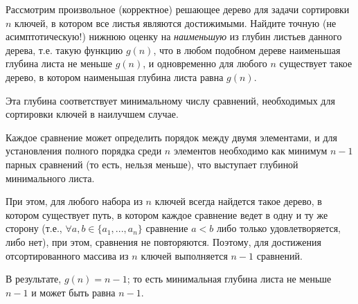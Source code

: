 \documentclass[11pt]{article}
\begin{document}
\begin{problem}{15}
Рассмотрим произвольное (корректное) решающее дерево для задачи сортировки $n$ ключей, в котором все листья являются достижимыми.
Найдите точную (не асимптотическую!) нижнюю оценку на \emph{наименьшую} из глубин листьев данного дерева, т.е.
такую функцию $g(n)$, что в любом подобном дереве наименьшая глубина листа не меньше $g(n)$,
и одновременно для любого $n$ существует такое дерево, в котором наименьшая глубина листа равна $g(n)$.
\end{problem}

\begin{solution}
	Эта глубина соответствует минимальному числу сравнений, необходимых для сортировки ключей в наилучшем случае.

	Каждое сравнение может определить порядок между двумя элементами, и для установления полного порядка среди $ n $ элементов необходимо как минимум $ n - 1 $ парных сравнений (то есть, нельзя меньше), что выступает глубиной минимального листа.

	При этом, для любого набора из $ n  $ ключей всегда найдется такое дерево, в котором существует путь, в котором каждое сравнение ведет в одну и ту же сторону (т.е., $ \forall a,b \in \{a_1, ..., a_n\} $ сравнение $ a < b $ либо только удовлетворяется, либо нет), при этом, сравнения не повторяются. Поэтому, для достижения отсортированного массива из $ n $ ключей выполняется $ n - 1 $ сравнений.

	В результате, $ g(n) = n - 1 $; то есть минимальная глубина листа не меньше $ n - 1 $ и может быть равна $ n - 1 $.

\end{solution}
\end{document}

